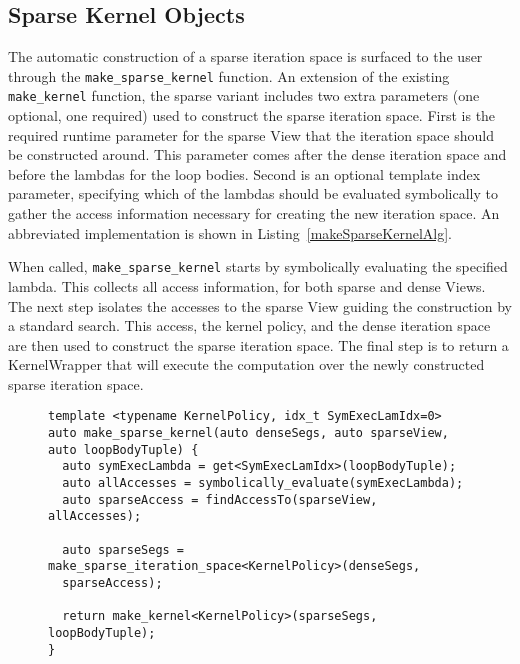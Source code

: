 \subsection{Sparse Kernel Objects}

The automatic construction of a sparse iteration space is surfaced to the user through the \verb.make_sparse_kernel. function.
An extension of the existing \verb.make_kernel. function, the sparse variant includes two extra parameters (one optional, one required) used to construct the sparse iteration space.
First is the required runtime parameter for the sparse View that the iteration space should be constructed around.
This parameter comes after the dense iteration space and before the lambdas for the loop bodies.
Second is an optional template index parameter, specifying which of the lambdas should be evaluated symbolically to gather the access information necessary for creating the new iteration space.
An abbreviated implementation is shown in Listing~\ref{makeSparseKernelAlg}.

When called, \verb.make_sparse_kernel. starts by symbolically evaluating the specified lambda.
This collects all access information, for both sparse and dense Views.
The next step isolates the accesses to the sparse View guiding the construction by a standard search.
This access, the kernel policy, and the dense iteration space are then used to construct the sparse iteration space.
The final step is to return a KernelWrapper that will execute the computation over the newly constructed sparse iteration space.

\begin{figure}
\begin{lstlisting}[caption={Abbreviated implementation of the function for creating a computation that automatically constructs the sparse iteration space.}, label=makeSparseKernelAlg]
template <typename KernelPolicy, idx_t SymExecLamIdx=0>
auto make_sparse_kernel(auto denseSegs, auto sparseView, auto loopBodyTuple) {
  auto symExecLambda = get<SymExecLamIdx>(loopBodyTuple);
  auto allAccesses = symbolically_evaluate(symExecLambda);
  auto sparseAccess = findAccessTo(sparseView, allAccesses);

  auto sparseSegs = make_sparse_iteration_space<KernelPolicy>(denseSegs, 
  sparseAccess);

  return make_kernel<KernelPolicy>(sparseSegs, loopBodyTuple);
}
\end{lstlisting}
\end{figure}

